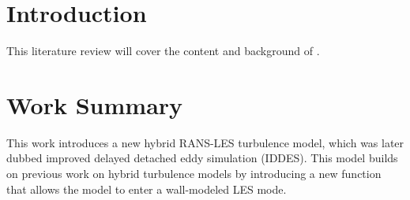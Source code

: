 \documentclass{ucb}
\begin{document}
\ucbcover{}

\section{Introduction}
This literature review will cover the content and background of \cite{shurHybridRANSLESApproach2008}. 

\section{Work Summary}
This work introduces a new hybrid RANS-LES turbulence model, which was later dubbed improved delayed detached eddy simulation (IDDES). This model builds on previous work on hybrid turbulence models by introducing a new function that allows the model to enter a wall-modeled LES mode.
\end{document}
